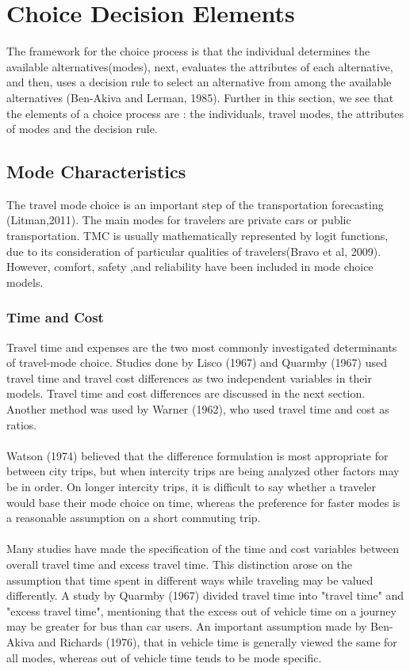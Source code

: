 \section{Choice Decision Elements}
The framework for the choice process is that the individual determines the available alternatives(modes), next, evaluates the attributes of each alternative, and then, uses a decision rule to select an alternative from among the available alternatives (Ben-Akiva and Lerman, 1985). Further in this section, we see that the elements of a choice process are : the individuals, travel modes, the attributes of modes and the decision rule.

\subsection{Mode Characteristics}
The travel mode choice is an important step of the transportation forecasting (Litman,2011). The main modes for travelers are private cars or public transportation. TMC is usually mathematically represented by logit functions, due to its consideration of particular qualities of travelers(Bravo et al, 2009). However, comfort, safety ,and reliability have been included in mode choice models.
\subsubsection{Time and Cost}
Travel time and expenses are the two most commonly investigated determinants of travel-mode choice. Studies done by Lisco (1967) and Quarmby (1967) used travel time and travel cost differences as two independent variables in their models. Travel time and cost differences are discussed in the next section. Another method was used by Warner (1962), who used travel time and cost as ratios.
\paragraph{}Watson (1974) believed that the difference formulation is most appropriate for between city trips, but when intercity trips are being analyzed other factors may be in order. On longer intercity trips, it is difficult to say whether a traveler would base their mode choice on time, whereas the preference for faster modes is a reasonable assumption on a short commuting trip. 
\paragraph{}Many studies have made the specification of the time and cost variables between overall travel time and excess travel time. This distinction arose on the assumption that time spent in different ways while traveling may be valued differently. A study by Quarmby (1967) divided travel time into "travel time" and "excess travel time", mentioning that the excess out of vehicle time on a journey may be greater for bus than car users. An important assumption made by Ben-Akiva and Richards (1976), that in vehicle time is generally viewed the same for all modes, whereas out of vehicle time tends to be mode  specific. 
